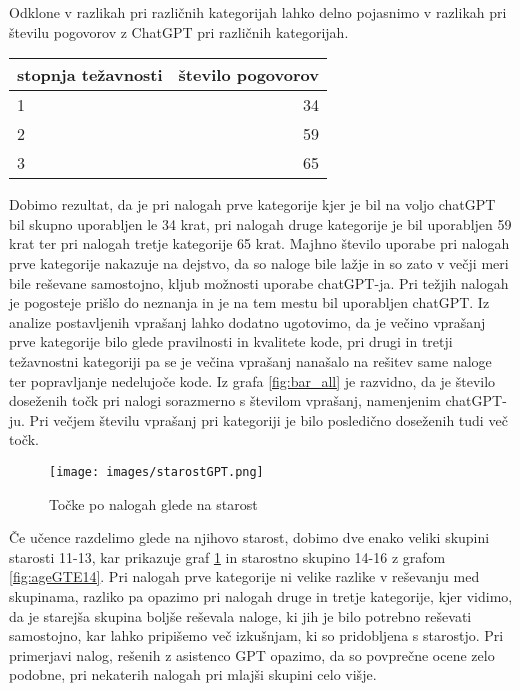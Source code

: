 \documentclass[a4paper,12pt,openright]{book}
\begin{document}
Odklone v razlikah pri različnih kategorijah lahko delno pojasnimo v razlikah pri številu pogovorov z ChatGPT pri različnih kategorijah.

\begin{tabular}{|l|r|}
\hline
\textbf{stopnja težavnosti} & \textbf{število pogovorov} \\
\hline
1 & 34 \\
\hline
2 & 59 \\
\hline
3 & 65 \\
\hline
\end{tabular}
\newline
\newline
Dobimo rezultat, da je pri nalogah prve kategorije kjer je bil na voljo chatGPT bil skupno uporabljen le 34 krat, pri nalogah druge kategorije je bil uporabljen 59 krat ter pri nalogah tretje kategorije 65 krat. Majhno število uporabe pri nalogah prve kategorije nakazuje na dejstvo, da so naloge bile lažje in so zato v večji meri bile reševane samostojno, kljub možnosti uporabe chatGPT-ja. Pri težjih nalogah je pogosteje prišlo do neznanja in je na tem mestu bil uporabljen chatGPT. Iz analize postavljenih vprašanj lahko dodatno ugotovimo, da je večino vprašanj prve kategorije bilo glede pravilnosti in kvalitete kode, pri drugi in tretji težavnostni kategoriji pa se je večina vprašanj nanašalo na rešitev same naloge ter popravljanje nedelujoče kode.
Iz grafa \ref{fig:bar_all} je razvidno, da je število doseženih točk pri nalogi sorazmerno s številom vprašanj, namenjenim chatGPT-ju. Pri večjem številu vprašanj pri kategoriji je bilo posledično doseženih tudi več točk. 

\pagebreak
\begin{figure}[H]
    \centering
    \texttt{[image: images/starostGPT.png]}
    \caption{Točke po nalogah glede na starost}
    \label{fig:ageLT14}
\end{figure}


Če učence razdelimo glede na njihovo starost, dobimo dve enako veliki skupini starosti 11-13, kar prikazuje graf \ref{fig:ageLT14} in starostno skupino 14-16 z grafom \ref{fig:ageGTE14}. Pri nalogah prve kategorije ni velike razlike v reševanju med skupinama, razliko pa opazimo pri nalogah druge in tretje kategorije, kjer vidimo, da je starejša skupina boljše reševala naloge, ki jih je bilo potrebno reševati samostojno, kar lahko pripišemo več izkušnjam, ki so pridobljena s starostjo. Pri primerjavi nalog, rešenih z asistenco GPT opazimo, da so povprečne ocene zelo podobne, pri nekaterih nalogah pri mlajši skupini celo višje.
\end{document}
